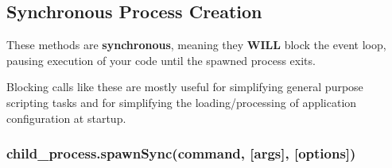 \subsection{Synchronous Process
Creation}\label{synchronous-process-creation}

These methods are \textbf{synchronous}, meaning they \textbf{WILL} block
the event loop, pausing execution of your code until the spawned process
exits.

Blocking calls like these are mostly useful for simplifying general
purpose scripting tasks and for simplifying the loading/processing of
application configuration at startup.

\subsubsection{child\_process.spawnSync(command, {[}args{]},
{[}options{]})}\label{childux5fprocess.spawnsynccommand-args-options}


